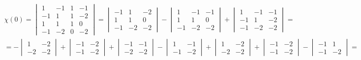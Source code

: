 \begin{multline*}
    \chi(0) =
    \begin{vmatrix}
        1 & -1 & 1 & -1 \\
        -1 & 1 & 1 & -2 \\
        1 & 1 & 1 & 0 \\
        -1 & -2 & 0 & -2
    \end{vmatrix} =
    \begin{vmatrix}
        -1 & 1 & -2 \\
        1 & 1 & 0 \\
        -1 & -2 & -2
    \end{vmatrix} -
    \begin{vmatrix}
        1 & -1 & -1 \\
        1 & 1 & 0 \\
        -1 & -2 & -2
    \end{vmatrix} +
    \begin{vmatrix}
        1 & -1 & -1 \\
        -1 & 1 & -2 \\
        -1 & -2 & -2
    \end{vmatrix} = \\
    = -
    \begin{vmatrix}
    	1 & -2 \\
        -2 & -2
    \end{vmatrix} +
    \begin{vmatrix}
    	-1 & -2 \\
        -1 & -2
    \end{vmatrix} +
    \begin{vmatrix}
    	-1 & -1 \\
        -2 & -2
    \end{vmatrix} -
    \begin{vmatrix}
    	1 & -1 \\
        -1 & -2
    \end{vmatrix} +
    \begin{vmatrix}
    	1 & -2 \\
        -2 & -2
    \end{vmatrix} +
    \begin{vmatrix}
    	-1 & -2 \\
        -1 & -2
    \end{vmatrix} -
    \begin{vmatrix}
    	-1 & 1 \\
        -1 & -2
    \end{vmatrix} = \\

\end{multline*}
